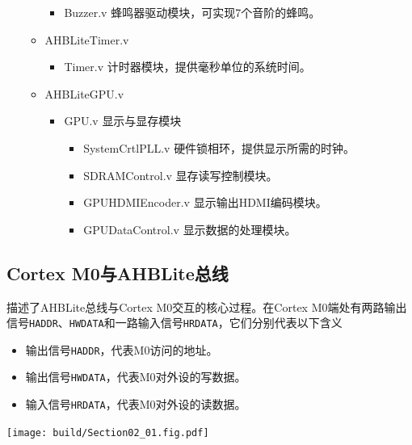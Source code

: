 \begin{itemize}
\begin{itemize}
        \begin{itemize}
            \item Buzzer.v  \textnormal{\small 蜂鸣器驱动模块，可实现7个音阶的蜂鸣。}
        \end{itemize}
        \item AHBLiteTimer.v 
        \begin{itemize}
            \item Timer.v  \textnormal{\small 计时器模块，提供毫秒单位的系统时间。}
        \end{itemize}
        \item AHBLiteGPU.v
        \begin{itemize}
            \item GPU.v \textnormal{\small 显示与显存模块}
            \begin{itemize}
                \item SystemCrtlPLL.v \textnormal{\small 硬件锁相环，提供显示所需的时钟。}
                \item SDRAMControl.v \textnormal{\small 显存读写控制模块。}
                \item GPUHDMIEncoder.v \textnormal{\small 显示输出HDMI编码模块。}
                \item GPUDataControl.v \textnormal{\small 显示数据的处理模块。}
            \end{itemize}
        \end{itemize}
    \end{itemize}
\end{itemize}


\subsection{Cortex M0与AHBLite总线}
描述了AHBLite总线与Cortex M0交互的核心过程。在Cortex M0端处有两路输出信号\texttt{HADDR}、\texttt{HWDATA}和一路输入信号\texttt{HRDATA}，它们分别代表以下含义
\begin{itemize}
    \item 输出信号\texttt{HADDR}，代表M0访问的地址。
    \item 输出信号\texttt{HWDATA}，代表M0对外设的写数据。
    \item 输入信号\texttt{HRDATA}，代表M0对外设的读数据。
\end{itemize}
\begin{Figure}[硬件架构]
    \texttt{[image: build/Section02\_01.fig.pdf]}
\end{Figure}

